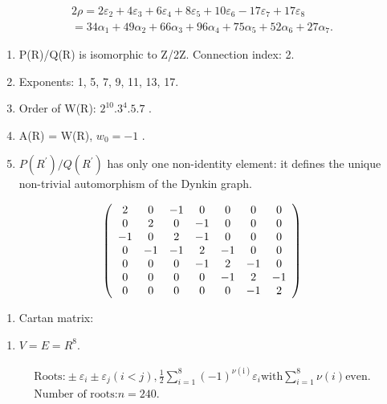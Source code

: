 \[
\begin{array}{l} 2 \rho = 2 \varepsilon_ {2} + 4 \varepsilon_ {3} + 6 \varepsilon_ {4} + 8 \varepsilon_ {5} + 10 \varepsilon_ {6} - 17 \varepsilon_ {7} + 17 \varepsilon_ {8} \\ = 34 \alpha_ {1} + 49 \alpha_ {2} + 66 \alpha_ {3} + 96 \alpha_ {4} + 75 \alpha_ {5} + 52 \alpha_ {6} + 27 \alpha_ {7}. \end{array}
\]


\begin{enumerate}
\def\labelenumi{(\Roman{enumi})}
\setcounter{enumi}{7}
\item
  P(R)/Q(R) is isomorphic to Z/2Z. Connection index: 2.
\item
  Exponents: 1, 5, 7, 9, 11, 13, 17.
\item
  Order of W(R): \(2^{10}.3^{4}.5.7\) .
\item
  A(R) = W(R), \(w_{0} = -1\) .
\item
  \(P(R^{\prime})/Q(R^{\prime})\) has only one non-identity element: it defines the unique non-trivial automorphism of the Dynkin graph.
\end{enumerate}

\[
\left( \begin{array}{c c c c c c c} 2 & 0 & - 1 & 0 & 0 & 0 & 0 \\ 0 & 2 & 0 & - 1 & 0 & 0 & 0 \\ - 1 & 0 & 2 & - 1 & 0 & 0 & 0 \\ 0 & - 1 & - 1 & 2 & - 1 & 0 & 0 \\ 0 & 0 & 0 & - 1 & 2 & - 1 & 0 \\ 0 & 0 & 0 & 0 & - 1 & 2 & - 1 \\ 0 & 0 & 0 & 0 & 0 & - 1 & 2 \end{array} \right)
\]

\begin{enumerate}
\def\labelenumi{(\Roman{enumi})}
\setcounter{enumi}{12}
\tightlist
\item
  Cartan matrix:
\end{enumerate}


\begin{enumerate}
\def\labelenumi{(\Roman{enumi})}
\tightlist
\item
  \(V = E = R^{8}.\)
\end{enumerate}

\[
\begin{array}{l} \text {Roots:} \pm \varepsilon_ {i} \pm \varepsilon_ {j} (i <   j), \frac {1}{2} \sum_ {i = 1} ^ {8} (- 1) ^ {\nu (\mathrm{i})} \varepsilon_ {i} \text {with} \sum_ {i = 1} ^ {8} \nu (i) \text {even.} \\ \text {Number of roots:} n = 240. \end{array}
\]

